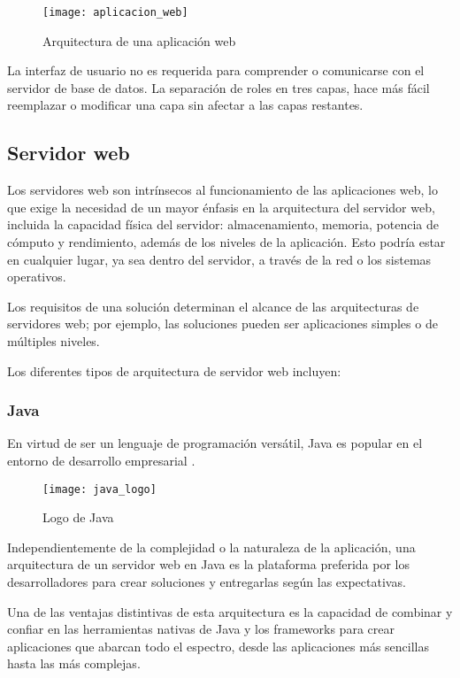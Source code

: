 \begin{figure}[htp!]
  \centering
  \texttt{[image: aplicacion\_web]}
  \caption{Arquitectura de una aplicación web}
  \label{fig:aplicacion_web}
\end{figure}

La interfaz de usuario no es requerida para comprender o comunicarse con el servidor de base de datos. La separación de roles en tres capas, hace más fácil reemplazar o modificar una capa sin afectar a las capas restantes.

\subsection{Servidor web}

Los servidores web son intrínsecos al funcionamiento de las aplicaciones web, lo que exige la necesidad de un mayor énfasis en la arquitectura del servidor web, incluida la capacidad física del servidor: almacenamiento, memoria, potencia de cómputo y rendimiento, además de los niveles de la aplicación. Esto podría estar en cualquier lugar, ya sea dentro del servidor, a través de la red o los sistemas operativos.

Los requisitos de una solución determinan el alcance de las arquitecturas de servidores web; por ejemplo, las soluciones pueden ser aplicaciones simples o de múltiples niveles.

Los diferentes tipos de arquitectura de servidor web incluyen:

\subsubsection{Java}

En virtud de ser un lenguaje de programación versátil, Java es popular en el entorno de desarrollo empresarial \cite{app5}.

\begin{figure}[htp!]
  \centering
  \texttt{[image: java\_logo]}
  \caption{Logo de Java}
  \label{fig:java_logo}
\end{figure}

Independientemente de la complejidad o la naturaleza de la aplicación, una arquitectura de un servidor web en Java es la plataforma preferida por los desarrolladores para crear soluciones y entregarlas según las expectativas.

Una de las ventajas distintivas de esta arquitectura es la capacidad de combinar y confiar en las herramientas nativas de Java y los frameworks para crear aplicaciones que abarcan todo el espectro, desde las aplicaciones más sencillas hasta las más complejas.


